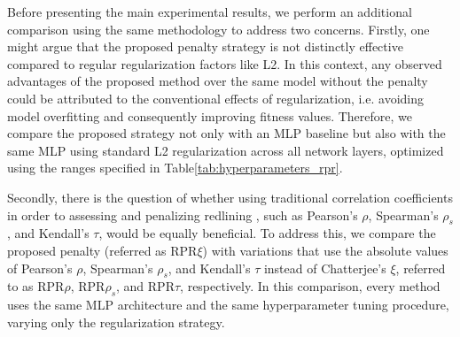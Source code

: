 Before presenting the main experimental results, we perform an additional comparison using the same methodology to address two concerns. Firstly, one might argue that the proposed penalty strategy is not distinctly effective compared to regular regularization factors like L2. In this context, any observed advantages of the proposed method over the same model without the penalty could be attributed to the conventional effects of regularization, i.e. avoiding model overfitting and consequently improving fitness values. Therefore, we compare the proposed strategy not only with an MLP baseline but also with the same MLP using standard L2 regularization across all network layers, optimized using the ranges specified in Table\ref{tab:hyperparameters_rpr}. 

Secondly, there is the question of whether using traditional correlation coefficients in order to assessing and penalizing redlining , such as Pearson's $\rho$, Spearman's $\rho_s$, and Kendall's $\tau$, would be equally beneficial. To address this, we compare the proposed penalty (referred as RPR$\xi$) with variations that use the absolute values of Pearson's $\rho$, Spearman's $\rho_s$, and Kendall's $\tau$ instead of Chatterjee's $\xi$, referred to as RPR$\rho$, RPR${\rho_s}$, and RPR$\tau$, respectively. In this comparison, every method uses the same MLP architecture and the same hyperparameter tuning procedure, varying only the regularization strategy.


